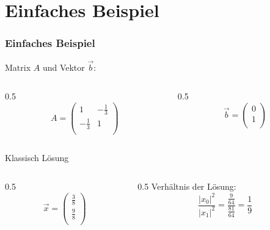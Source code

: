 \section{Einfaches Beispiel}

\begin{frame}
    \frametitle{Einfaches Beispiel}

    Matrix $A$ und Vektor $\vec{b}$:
    \begin{columns}[c]
        \begin{column}{0.5\hsize}\centering
            $$A = \begin{pmatrix} 1 & -\frac{1}{3}\\ -\frac{1}{3} & 1\\ \end{pmatrix}$$
        \end{column}

        \begin{column}{0.5\hsize}
            $$\vec{b} = \begin{pmatrix} 0 \\ 1\\ \end{pmatrix}$$
        \end{column}
    \end{columns}
 
    \hfil

    \hfil

    Klassisch Lösung
    \begin{columns}[c]
        \begin{column}{0.5\hsize}
            \centering
            $$\vec{x} = \begin{pmatrix} \frac{3}{8}\\ \frac{9}{8}\\ \end{pmatrix}$$
        \end{column}

        \begin{column}{0.5\hsize}
            \centering
            Verhältnis der Lösung:
            $$\frac{ |x_0|^2}{ |x_1|^2}= \frac{\frac{9}{64}}{\frac{81}{64}} = \frac{1}{9}$$
        \end{column}
    \end{columns}
 
    \hfil

    \hfil

\end{frame}

